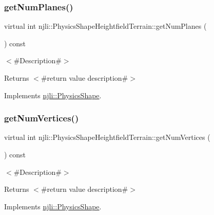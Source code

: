 \subsubsection{\texorpdfstring{get\+Num\+Planes()}{getNumPlanes()}}
{\footnotesize\ttfamily virtual int njli\+::\+Physics\+Shape\+Heightfield\+Terrain\+::get\+Num\+Planes (\begin{DoxyParamCaption}{ }\end{DoxyParamCaption}) const\hspace{0.3cm}{\ttfamily [virtual]}}

$<$\#\+Description\#$>$

\begin{DoxyReturn}{Returns}
$<$\#return value description\#$>$ 
\end{DoxyReturn}


Implements \mbox{\hyperlink{classnjli_1_1_physics_shape_a11cb80220393bfce177b8bdc34f7f359}{njli\+::\+Physics\+Shape}}.

\mbox{\label{classnjli_1_1_physics_shape_heightfield_terrain_af6b7c8322826c83fc672b1ddc50d70fa}} 
\subsubsection{\texorpdfstring{get\+Num\+Vertices()}{getNumVertices()}}
{\footnotesize\ttfamily virtual int njli\+::\+Physics\+Shape\+Heightfield\+Terrain\+::get\+Num\+Vertices (\begin{DoxyParamCaption}{ }\end{DoxyParamCaption}) const\hspace{0.3cm}{\ttfamily [virtual]}}

$<$\#\+Description\#$>$

\begin{DoxyReturn}{Returns}
$<$\#return value description\#$>$ 
\end{DoxyReturn}


Implements \mbox{\hyperlink{classnjli_1_1_physics_shape_ac3f7cc28341fd58ace164bf8666480f0}{njli\+::\+Physics\+Shape}}.

\mbox{\label{classnjli_1_1_physics_shape_heightfield_terrain_a3b815c83cd5b90b6982aff44aa80c67e}} 
